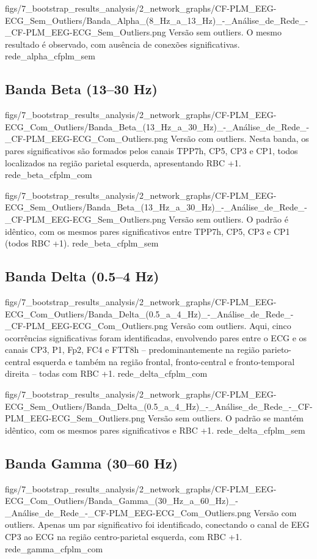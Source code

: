 \standardfigure
{figs/7_bootstrap_results_analysis/2_network_graphs/CF-PLM_EEG-ECG_Sem_Outliers/Banda_Alpha_(8_Hz_a_13_Hz)_-_Análise_de_Rede_-_CF-PLM_EEG-ECG_Sem_Outliers.png}
{Versão sem outliers. O mesmo resultado é observado, com ausência de conexões significativas.}
{rede_alpha_cfplm_sem}


\subsection{Banda Beta (13–30 Hz)}
\standardfigure
{figs/7_bootstrap_results_analysis/2_network_graphs/CF-PLM_EEG-ECG_Com_Outliers/Banda_Beta_(13_Hz_a_30_Hz)_-_Análise_de_Rede_-_CF-PLM_EEG-ECG_Com_Outliers.png}
{Versão com outliers. Nesta banda, os pares significativos são formados pelos canais TPP7h, CP5, CP3 e CP1, todos localizados na região parietal esquerda, apresentando RBC +1.}
{rede_beta_cfplm_com}

\standardfigure
{figs/7_bootstrap_results_analysis/2_network_graphs/CF-PLM_EEG-ECG_Sem_Outliers/Banda_Beta_(13_Hz_a_30_Hz)_-_Análise_de_Rede_-_CF-PLM_EEG-ECG_Sem_Outliers.png}
{Versão sem outliers. O padrão é idêntico, com os mesmos pares significativos entre TPP7h, CP5, CP3 e CP1 (todos RBC +1).}
{rede_beta_cfplm_sem}

\subsection{Banda Delta (0.5–4 Hz)}
\standardfigure
{figs/7_bootstrap_results_analysis/2_network_graphs/CF-PLM_EEG-ECG_Com_Outliers/Banda_Delta_(0.5_a_4_Hz)_-_Análise_de_Rede_-_CF-PLM_EEG-ECG_Com_Outliers.png}
{Versão com outliers. Aqui, cinco ocorrências significativas foram identificadas, envolvendo pares entre o ECG e os canais CP3, P1, Fp2, FC4 e FTT8h – predominantemente na região parieto-central esquerda e também na região frontal, fronto-central e fronto-temporal direita – todas com RBC +1.}
{rede_delta_cfplm_com}

\standardfigure
{figs/7_bootstrap_results_analysis/2_network_graphs/CF-PLM_EEG-ECG_Sem_Outliers/Banda_Delta_(0.5_a_4_Hz)_-_Análise_de_Rede_-_CF-PLM_EEG-ECG_Sem_Outliers.png}
{Versão sem outliers. O padrão se mantém idêntico, com os mesmos pares significativos e RBC +1.}
{rede_delta_cfplm_sem}

\subsection{Banda Gamma (30–60 Hz)}
\standardfigure
{figs/7_bootstrap_results_analysis/2_network_graphs/CF-PLM_EEG-ECG_Com_Outliers/Banda_Gamma_(30_Hz_a_60_Hz)_-_Análise_de_Rede_-_CF-PLM_EEG-ECG_Com_Outliers.png}
{Versão com outliers. Apenas um par significativo foi identificado, conectando o canal de EEG CP3 ao ECG na região centro-parietal esquerda, com RBC +1.}
{rede_gamma_cfplm_com}

